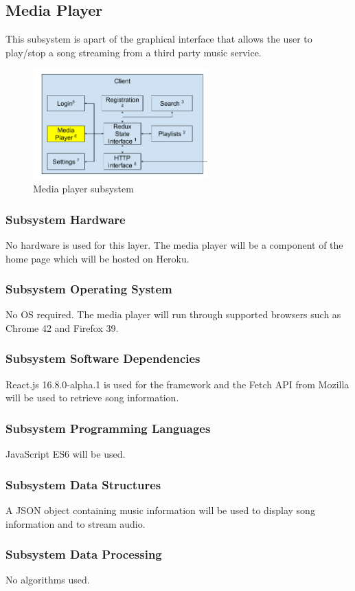 \subsection{Media Player}
This subsystem is apart of the graphical interface that allows the user to play/stop a song streaming from a third party music service.

\begin{figure}[h!]
	\centering
 	\includegraphics[width=0.60\textwidth]{images/client/client_media.png}
 	\caption{Media player subsystem}
\end{figure}

\subsubsection{Subsystem Hardware}
No hardware is used for this layer. The media player will be a component of the home page which will be hosted on Heroku.

\subsubsection{Subsystem Operating System}
No OS required. The media player will run through supported browsers such as Chrome 42 and Firefox 39.

\subsubsection{Subsystem Software Dependencies}
React.js 16.8.0-alpha.1 is used for the framework and the Fetch API from Mozilla will be used to retrieve song information.

\subsubsection{Subsystem Programming Languages}
JavaScript ES6 will be used.

\subsubsection{Subsystem Data Structures}
A JSON object containing music information will be used to display song information and to stream audio.

\subsubsection{Subsystem Data Processing}
No algorithms used.


\newpage